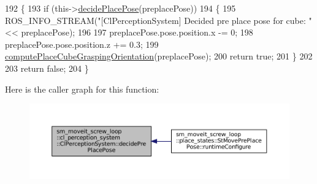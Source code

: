 \begin{DoxyCode}
192             \{
193                 \textcolor{keywordflow}{if} (this->\hyperlink{classsm__moveit__screw__loop_1_1cl__perception__system_1_1ClPerceptionSystem_a9157b898cd0b4004cf3d9144f7c1d163}{decidePlacePose}(preplacePose))
194                 \{
195                     ROS\_INFO\_STREAM(\textcolor{stringliteral}{"[ClPerceptionSystem] Decided pre place pose for cube: "} << 
      preplacePose);
196 
197                     preplacePose.pose.position.x -= 0;
198                     preplacePose.pose.position.z += 0.3;
199                     \hyperlink{classsm__moveit__screw__loop_1_1cl__perception__system_1_1ClPerceptionSystem_a8e5d2e5a7f3ba117c67534750237cada}{computePlaceCubeGraspingOrientation}(preplacePose);
200                     \textcolor{keywordflow}{return} \textcolor{keyword}{true};
201                 \}
202 
203                 \textcolor{keywordflow}{return} \textcolor{keyword}{false};
204             \}
\end{DoxyCode}
Here is the caller graph for this function\+:
\nopagebreak
\begin{figure}[H]
\begin{center}
\leavevmode
\includegraphics[width=350pt]{classsm__moveit__screw__loop_1_1cl__perception__system_1_1ClPerceptionSystem_af1369e37cbf7e9a14fd547290f426af3_icgraph}
\end{center}
\end{figure}
\mbox{\label{classsm__moveit__screw__loop_1_1cl__perception__system_1_1ClPerceptionSystem_a134e71d552de7d2a601927cdb2903d2b}} 
